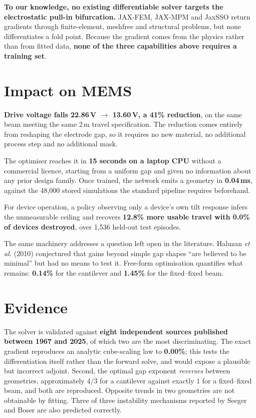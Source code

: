 \documentclass[9pt,twocolumn]{extarticle}
\begin{document}
\textbf{To our knowledge, no existing differentiable solver targets the
electrostatic pull-in bifurcation.} JAX-FEM, JAX-MPM and JaxSSO return
gradients through finite-element, meshfree and structural problems, but none
differentiates a fold point. Because the gradient comes from the physics rather
than from fitted data, \textbf{none of the three capabilities above requires a
training set}.

\section{Impact on MEMS}

\textbf{Drive voltage falls 22.86\,V $\rightarrow$ 13.60\,V, a 41\% reduction},
on the same beam meeting the same 2\,\textmu m travel specification. The
reduction comes entirely from reshaping the electrode gap, so it requires no
new material, no additional process step and no additional mask.

The optimiser reaches it in \textbf{15 seconds on a laptop CPU} without a
commercial licence, starting from a uniform gap and given no information about
any prior design family. Once trained, the network emits a geometry in
\textbf{0.04\,ms}, against the 48{,}000 stored simulations the standard
pipeline requires beforehand.

For device operation, a policy observing only a device's own tilt response
infers the unmeasurable ceiling and recovers \textbf{12.8\% more usable travel
with 0.0\% of devices destroyed}, over 1{,}536 held-out test episodes.

The same machinery addresses a question left open in the literature. Haluzan
\emph{et al.} (2010) conjectured that gains beyond simple gap shapes ``are
believed to be minimal'' but had no means to test it. Free-form optimisation
quantifies what remains: \textbf{0.14\%} for the cantilever and
\textbf{1.45\%} for the fixed--fixed beam.

\section{Evidence}

The solver is validated against \textbf{eight independent sources published
between 1967 and 2025}, of which two are the most discriminating. The exact
gradient reproduces an analytic cube-scaling law to \textbf{0.00\%}; this tests
the differentiation itself rather than the forward solve, and would expose a
plausible but incorrect adjoint. Second, the optimal gap exponent
\emph{reverses} between geometries, approximately $4/3$ for a cantilever
against exactly $1$ for a fixed--fixed beam, and both are reproduced. Opposite
trends in two geometries are not obtainable by fitting. Three of three
instability mechanisms reported by Seeger and Boser are also predicted
correctly.
\end{document}
